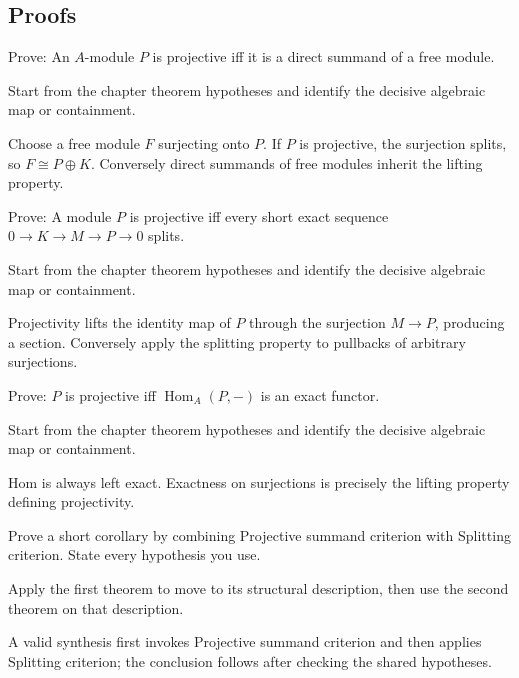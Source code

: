 \subsection*{Proofs}

\begin{exercise}\label{exr:v13-expand-06}
Prove: An $A$-module $P$ is projective iff it is a direct summand of a free module.
\end{exercise}
\begin{hint}
Start from the chapter theorem hypotheses and identify the decisive algebraic map or containment.
\end{hint}
\begin{solution}
Choose a free module $F$ surjecting onto $P$. If $P$ is projective, the surjection splits, so $F\cong P\oplus K$. Conversely direct summands of free modules inherit the lifting property.
\end{solution}

\begin{exercise}\label{exr:v13-expand-07}
Prove: A module $P$ is projective iff every short exact sequence $0\to K\to M\to P\to0$ splits.
\end{exercise}
\begin{hint}
Start from the chapter theorem hypotheses and identify the decisive algebraic map or containment.
\end{hint}
\begin{solution}
Projectivity lifts the identity map of $P$ through the surjection $M\to P$, producing a section. Conversely apply the splitting property to pullbacks of arbitrary surjections.
\end{solution}

\begin{exercise}\label{exr:v13-expand-08}
Prove: $P$ is projective iff $\operatorname{Hom}_A(P,-)$ is an exact functor.
\end{exercise}
\begin{hint}
Start from the chapter theorem hypotheses and identify the decisive algebraic map or containment.
\end{hint}
\begin{solution}
Hom is always left exact. Exactness on surjections is precisely the lifting property defining projectivity.
\end{solution}

\begin{exercise}\label{exr:v13-expand-09}
Prove a short corollary by combining Projective summand criterion with Splitting criterion. State every hypothesis you use.
\end{exercise}
\begin{hint}
Apply the first theorem to move to its structural description, then use the second theorem on that description.
\end{hint}
\begin{solution}
A valid synthesis first invokes Projective summand criterion and then applies Splitting criterion; the conclusion follows after checking the shared hypotheses.
\end{solution}

